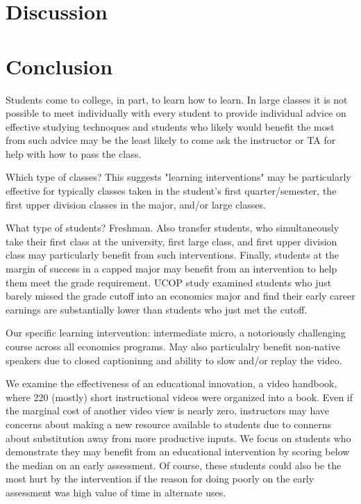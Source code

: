 \documentclass[12pt]{article}
\begin{document}
\section{Discussion} \label{discussion}


\section{Conclusion} \label{conclusion}

Students come to college, in part, to learn how to learn.  In large classes it is not possible to meet individually with every student to provide individual advice on effective studying technoques and students who likely would benefit the most from such advice may be the least likely to come ask the instructor or TA for help with how to pass the class.  

Which type of classes?  This suggests "learning interventions" may be particularly effective for typically classes taken in the student's first quarter/semester, the first upper division classes in the major, and/or large classes. 

What type of students? Freshman.  Also transfer students, who simultaneously take their first class at the university, first large class, and first upper division class may particularly benefit from such interventions.  Finally, students at the margin of success in a capped major may benefit from an intervention to help them meet the grade requirement.  UCOP study examined students who just barely missed the grade cutoff into an economics major and find their early career earnings are substantially lower than students who just met the cutoff.

Our specific learning intervention:  intermediate micro, a notoriously challenging course across all economics programs.  May also particulalry benefit non-native speakers due to closed captioninng and ability to slow and/or replay the video.  

We examine the effectiveness of an educational innovation, a video handbook, where 220 (mostly) short instructional videos were organized into a book.  Even if the marginal cost of another video view is nearly zero, instructors may have concerns about making a new resource available to students due to connerns about substitution away from more productive inputs. We focus on students who demonstrate they may benefit from an educational intervention by scoring below the median on an early assessment.  Of course, these students could also be the most hurt by the intervention if the reason for doing poorly on the early assessment was high value of time in alternate uses.
\end{document}
